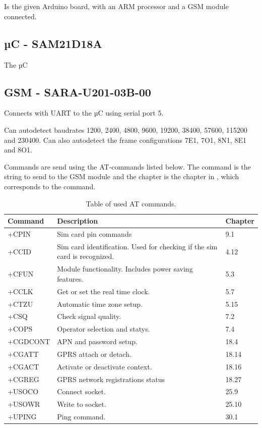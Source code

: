 \section{\MKR}
Is the given Arduino board, with an ARM processor and a GSM module connected.

\subsection{µC - SAM21D18A}
The µC 

\subsection{GSM - SARA-U201-03B-00}
Connects with UART to the µC using serial port 5.

Can autodetect baudrates \num{1200}, \num{2400}, \num{4800}, \num{9600}, \num{19200}, \num{38400}, \num{57600}, \num{115200} and \num{230400}. Can also autodetect the frame configurations  7E1, 7O1, 8N1, 8E1 and 8O1.

Commands are send using the AT-commands listed below. The command is the string to send to the GSM module and the chapter is the chapter in \cite{ATcommands}, which corresponds to the command.

\begin{table}
	\begin{tabularx}{\textwidth}{l X X}
		\toprule
		Command & Description & Chapter \\
		\midrule
		+CPIN & Sim card pin commands & 9.1 \\
		+CCID & Sim card identification. Used for checking if the sim card is recognized. & 4.12 \\
		+CFUN & Module functionality. Includes power saving features. & 5.3 \\
		+CCLK & Get or set the real time clock. & 5.7 \\
		+CTZU & Automatic time zone setup. & 5.15 \\
		+CSQ & Check signal quality. & 7.2 \\
		+COPS & Operator selection and statys. & 7.4 \\
		+CGDCONT & APN and password setup. & 18.4 \\
		+CGATT & GPRS attach or detach. & 18.14 \\
		+CGACT & Activate or deactivate context. & 18.16 \\
		+CGREG & GPRS network registrations status & 18.27 \\
		+USOCO & Connect socket. & 25.9 \\
		+USOWR & Write to socket. & 25.10 \\
		+UPING & Ping command. & 30.1 \\
		\bottomrule
	\end{tabularx}
	\caption{Table of used AT commands.}
	\label{tab:ATcomm}
\end{table}


